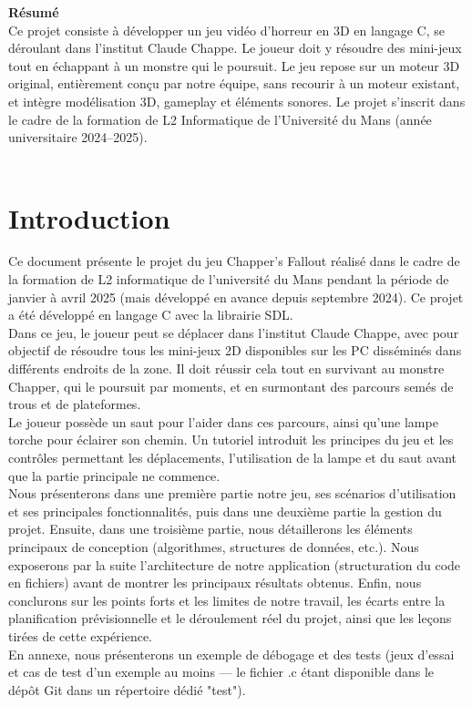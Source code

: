\newpage
    \textbf{Résumé}\\
    Ce projet consiste à développer un jeu vidéo d’horreur en 3D en langage C,
    se déroulant dans l’institut Claude Chappe. Le joueur doit y résoudre des
    mini-jeux tout en échappant à un monstre qui le poursuit. Le jeu repose sur
    un moteur 3D original, entièrement conçu par notre équipe, sans recourir à un
    moteur existant, et intègre modélisation 3D, gameplay et éléments sonores.
    Le projet s’inscrit dans le cadre de la formation de L2 Informatique de
    l’Université du Mans (année universitaire 2024–2025).\\\\
\section{Introduction}
\label{sec:intro}
Ce document présente le projet du jeu Chapper's Fallout réalisé dans le cadre de
la formation de L2 informatique de l’université du Mans pendant la période de
janvier à avril 2025 (mais développé en avance depuis septembre 2024). Ce projet
a été développé en langage C avec la librairie SDL.\\

Dans ce jeu, le joueur peut se déplacer dans l’institut Claude Chappe, avec pour
objectif de résoudre tous les mini-jeux 2D disponibles sur les PC disséminés dans
différents endroits de la zone. Il doit réussir cela tout en survivant au monstre
Chapper, qui le poursuit par moments, et en surmontant des parcours semés de trous
et de plateformes.\\

Le joueur possède un saut pour l’aider dans ces parcours, ainsi qu’une lampe torche
pour éclairer son chemin. Un tutoriel introduit les principes du jeu et les contrôles
permettant les déplacements, l’utilisation de la lampe et du saut avant que la
partie principale ne commence.\\

Nous présenterons dans une première partie notre jeu, ses scénarios d’utilisation
et ses principales fonctionnalités, puis dans une deuxième partie la gestion du
projet. Ensuite, dans une troisième partie, nous détaillerons les éléments principaux
de conception (algorithmes, structures de données, etc.). Nous exposerons par la
suite l’architecture de notre application (structuration du code en fichiers) avant
de montrer les principaux résultats obtenus. Enfin, nous conclurons sur les points
forts et les limites de notre travail, les écarts entre la planification
prévisionnelle et le déroulement réel du projet, ainsi que les leçons tirées de
cette expérience.\\

En annexe, nous présenterons un exemple de débogage et des tests (jeux d’essai
et cas de test d’un exemple au moins — le fichier .c étant disponible dans le
dépôt Git dans un répertoire dédié "test").
\newpage
